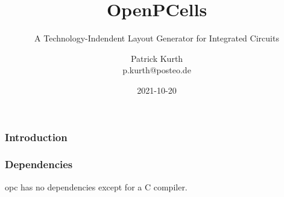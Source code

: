 \documentclass[dvipsnames, x11names, svgnames, 11pt]{beamer}
\title{OpenPCells}
\subtitle{A Technology-Indendent Layout Generator for Integrated Circuits}
\author{Patrick Kurth\\p.kurth@posteo.de}
\date{2021-10-20}
\begin{document}
\maketitle
\begin{frame}
    \frametitle{Introduction}
\end{frame}
\begin{frame}
    \frametitle{Dependencies}
    opc has no dependencies except for a C compiler.
\end{frame}
\end{document}
